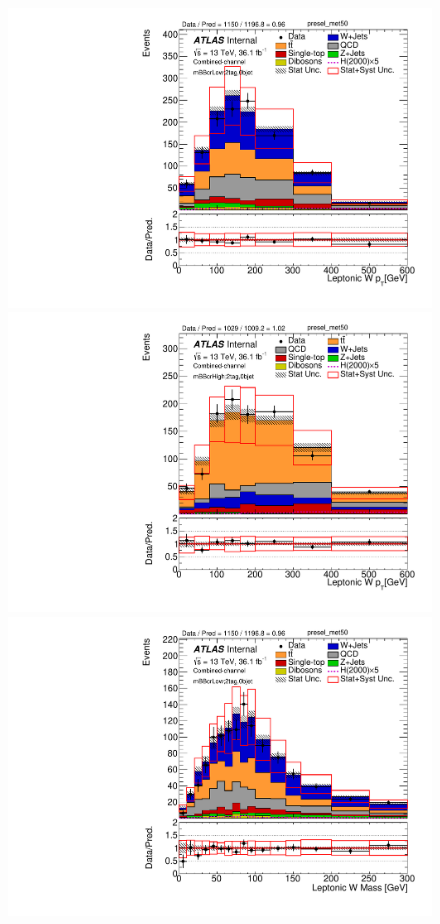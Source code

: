 \begin{figure}[!h]
\begin{center}
\includegraphics[scale=0.33]{./figures/boosted/PlotByMbbRegions/DataMC_2tag_0bjet_mbbcrLow_lepton_presel_met50_WlepPt}                                                                              
\includegraphics[scale=0.33]{./figures/boosted/PlotByMbbRegions/DataMC_2tag_0bjet_mbbcrHigh_lepton_presel_met50_WlepPt}                                                                             
\includegraphics[scale=0.33]{./figures/boosted/PlotByMbbRegions/DataMC_2tag_0bjet_mbbcrLow_lepton_presel_met50_WlepMass}                                                                            

\end{center}
\end{figure}
